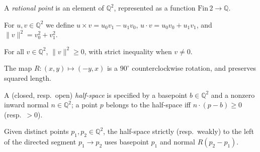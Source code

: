 \begin{definition}
  \label{def:rational-point}
  \leanok
  A \emph{rational point} is an element of $\mathbb{Q}^2$, represented as a
  function $\mathrm{Fin}\,2 \to \mathbb{Q}$.
\end{definition}

\begin{definition}
  \label{def:rational-ops}
  \leanok
  For $u, v \in \mathbb{Q}^2$ we define
  $u \times v = u_0 v_1 - u_1 v_0$,
  $u \cdot v = u_0 v_0 + u_1 v_1$, and
  $\lVert v\rVert^2 = v_0^2 + v_1^2$.
\end{definition}

\begin{lemma}
  \label{lem:lengthSq-pos}
  \leanok
  For all $v \in \mathbb{Q}^2$, $\lVert v\rVert^2 \ge 0$, with strict
  inequality when $v \ne 0$.
\end{lemma}

\begin{definition}
  \label{def:rotate90}
  \leanok
  The map $R : (x, y) \mapsto (-y, x)$ is a $90^\circ$ counterclockwise
  rotation, and preserves squared length.
\end{definition}

\begin{definition}
  \label{def:halfspace}
  \leanok
  A (closed, resp.\ open) \emph{half-space} is specified by a basepoint
  $b \in \mathbb{Q}^2$ and a nonzero inward normal $n \in \mathbb{Q}^2$;
  a point $p$ belongs to the half-space iff $n \cdot (p - b) \ge 0$
  (resp.\ $> 0$).
\end{definition}

\begin{definition}
  \label{def:toLeft}
  \leanok
  Given distinct points $p_1, p_2 \in \mathbb{Q}^2$, the half-space
  strictly (resp.\ weakly) to the left of the directed segment
  $p_1 \to p_2$ uses basepoint $p_1$ and normal $R(p_2 - p_1)$.
\end{definition}

